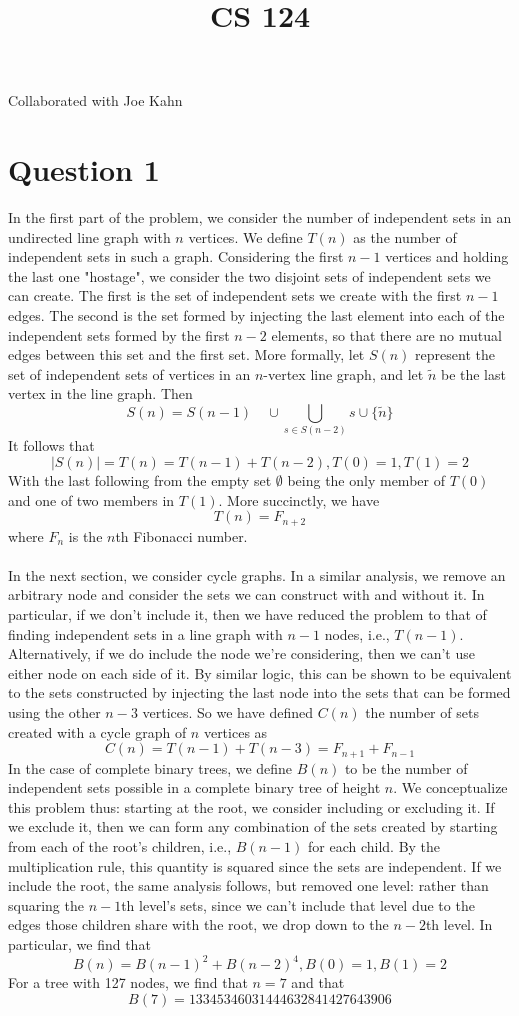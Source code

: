 \documentclass[12pt]{article}
\title{CS 124 \exerciseset}
\author{\studentname}
\begin{document}
\maketitle
Collaborated with Joe Kahn
\section*{Question 1}
In the first part of the problem, we consider the number of independent sets in an undirected line graph with $n$ vertices. We define $T(n)$ as the number of independent sets in such a graph. Considering the first $n-1$ vertices and holding the last one "hostage", we consider the two disjoint sets of independent sets we can create. The first is the set of independent sets we create with the first $n-1$ edges. The second is the set formed by injecting the last element into each of the independent sets formed by the first $n-2$ elements, so that there are no mutual edges between this set and the first set. More formally, let $S(n)$ represent the set of independent sets of vertices in an $n$-vertex line graph, and let $\tilde{n}$ be the last vertex in the line graph. Then 
$$S(n) = S(n-1) \quad 
\cup \bigcup_{s \in S(n-2)} s \cup \{\tilde{n}\}$$
It follows that
$$\left\vert{S(n)}\right\vert = T(n) = T(n-1) + T(n-2), T(0) = 1, T(1) = 2$$
With the last following from the empty set $\emptyset$ being the only member of $T(0)$ and one of two members in $T(1)$. More succinctly, we have
$$T(n) = F_{n+2}$$
where $F_n$ is the $n$th Fibonacci number.\\\\

In the next section, we consider cycle graphs. In a similar analysis, we remove an arbitrary node and consider the sets we can construct with and without it. In particular, if we don't include it, then we have reduced the problem to that of finding independent sets in a line graph with $n-1$ nodes, i.e., $T(n-1)$. Alternatively, if we do include the node we're considering, then we can't use either node on each side of it. By similar logic, this can be shown to be equivalent to the sets constructed by injecting the last node into the sets that can be formed using the other $n-3$ vertices. So we have defined $C(n)$ the number of sets created with a cycle graph of $n$ vertices as 
$$C(n) = T(n-1) + T(n-3) = F_{n+1} + F_{n-1}$$
In the case of complete binary trees, we define $B(n)$ to be the number of independent sets possible in a complete binary tree of height $n$. We conceptualize this problem thus: starting at the root, we consider including or excluding it. If we exclude it, then we can form any combination of the sets created by starting from each of the root's children, i.e., $B(n-1)$ for each child. By the multiplication rule, this quantity is squared since the sets are independent. If we include the root, the same analysis follows, but removed one level: rather than squaring the $n-1$th level's sets, since we can't include that level due to the edges those children share with the root, we drop down to the $n-2$th level. In particular, we find that $$B(n) = B(n-1)^2 + B(n-2)^4, B(0) = 1, B(1) = 2$$
For a tree with 127 nodes, we find that $n = 7$ and that $$B(7) = 13345346031444632841427643906$$
\end{document}
